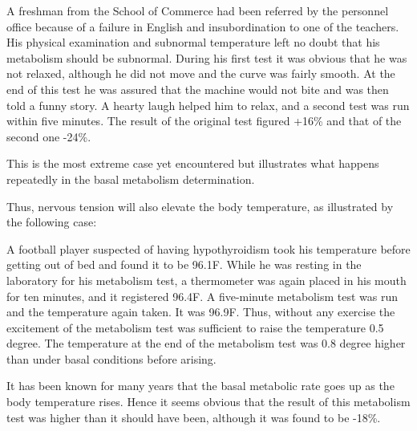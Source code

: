 \documentclass[10pt, letterpaper]{memoir}
\begin{document}
\begin{multicols}{2}
\begin{center}
\begin{minipage}{0.95\columnwidth}
\hspace*{1em}\small A freshman from the School of Commerce had been referred by the personnel office because of a failure in English and insubordination to one of the teachers. His physical examination and subnormal temperature left no doubt that his metabolism should be subnormal. During his first test it was obvious that he was not relaxed, although he did not move and the curve was fairly smooth. At the end of this test he was assured that the machine would not bite and was then told a funny story. A hearty laugh helped him to relax, and a second test was run within five minutes. The result of the original test figured +16\% and that of the second one -24\%.
\end{minipage}
\end{center}

This is the most extreme case yet encountered but illustrates what happens repeatedly in the basal metabolism determination.

Thus, nervous tension will also elevate the body
temperature, as illustrated by the following case:

\begin{center}
\begin{minipage}{0.95\columnwidth}
\hspace*{1em}\small A football player suspected of having hypothyroidism took his temperature before getting out of bed and found it to be 96.1\textdegree{}F. While he was resting in the laboratory for his metabolism test, a thermometer was again placed in his mouth for ten minutes, and it registered 96.4\textdegree{}F. A five-minute metabolism test was run and the temperature again taken. It was 96.9\textdegree{}F. Thus, without any exercise the excitement of the metabolism test was sufficient to raise the temperature 0.5 degree. The temperature at the end of the metabolism test was 0.8 degree higher than under basal conditions before arising.
\end{minipage}
\end{center}

It has been known for many years that the basal metabolic rate goes up as the body temperature rises. Hence it seems obvious that the result of this metabolism test was higher than it should have been, although it was found to be -18\%.


\end{multicols}
\end{document}
